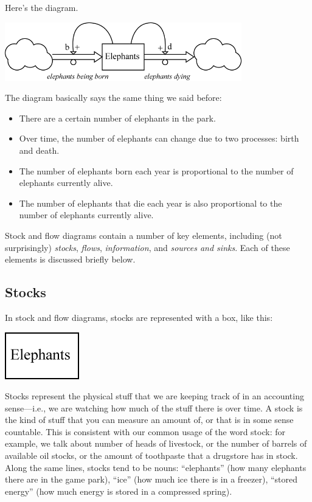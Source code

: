 Here's the diagram.

\beforefig
\centerline{\includegraphics[height=1in]{figs/ElephantStockAndFlow1}}
\afterfig

The diagram basically says the same thing we said before:

\begin{itemize}
\item There are a certain number of elephants in the park.
\item Over time, the number of elephants can change due to two processes: birth and death.
\item The number of elephants born each year is proportional to the number of elephants currently alive.
\item The number of elephants that die each year is also proportional to the number of elephants currently alive.
\end{itemize}

Stock and flow diagrams contain a number of key elements, including (not surprisingly) {\it stocks}, {\it flows}, {\it information}, and {\it sources and sinks}.  Each of these elements is discussed briefly below.


\subsection{Stocks}

In stock and flow diagrams, stocks are represented with a box, like this:

\beforefig
\centerline{\includegraphics[height=.5in]{figs/Stock}}
\afterfig

Stocks represent the physical stuff that we are keeping track of in an accounting sense---i.e., we are watching how much of the stuff there is over time. A stock is the kind of stuff that you can measure an amount of, or that is in some sense countable.  This is consistent with our common usage of the word stock:  for example, we talk about number of heads of livestock, or the number of barrels of available oil stocks, or the amount of toothpaste that a drugstore has in stock.  Along the same lines, stocks tend to be nouns:  ``elephants'' (how many elephants there are in the game park), ``ice'' (how much ice there is in a freezer), ``stored energy'' (how much energy is stored in a compressed spring).  

